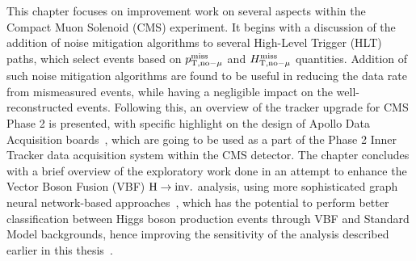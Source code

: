\label{chapter:outlook}

This chapter focuses on improvement work on several aspects within the
Compact Muon Solenoid (CMS) experiment. It begins with a discussion of the
addition of noise mitigation algorithms to several High-Level Trigger (HLT)
paths, which select events based on $p_{\textrm{T},\textrm{no}-\mu}^{\textrm{miss}}$ and $H_{\textrm{T},\textrm{no}-\mu}^{\textrm{miss}}$ quantities. 
Addition of such noise mitigation algorithms are found to be useful in reducing the
data rate from mismeasured events, while having a negligible impact on the
well-reconstructed events. Following this, an overview of the tracker upgrade
for CMS Phase 2 is presented, with specific highlight on the design of
Apollo Data Acquisition boards~\cite{CMS:ApolloPaper}, 
which are going to be used as a part of the Phase 2
Inner Tracker data acquisition system within the CMS detector. 
The chapter concludes with a brief
overview of the exploratory work done in an attempt to enhance 
the Vector Boson Fusion (VBF) $\textrm{H} \rightarrow \textrm{inv.}$ analysis, 
using more sophisticated graph neural network-based 
approaches~\cite{CMS:ParticleNetPaper}, which has the potential to perform
better classification between Higgs boson production events through VBF and
Standard Model backgrounds, hence improving the sensitivity of the analysis 
described earlier in this thesis~\cite{VBFHinvAnalysisPaper}.

\finishchapterabstract






